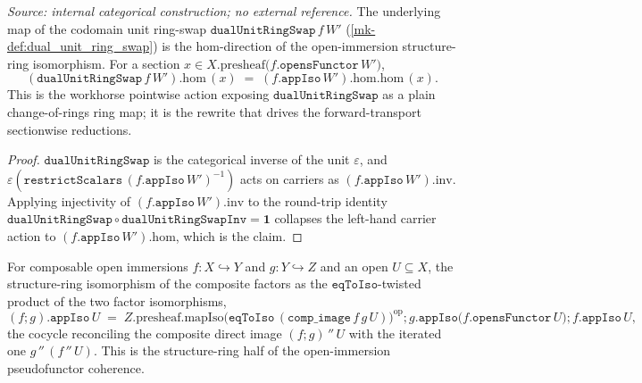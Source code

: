 \begin{lemma}\label{mk-lem:dual_unit_ring_swap_apply}
  \leanok

  \textit{Source: internal categorical construction; no external reference.}
  The underlying map of the codomain unit ring-swap \(\mathtt{dualUnitRingSwap}\,f\,W'\)
  (\ref{mk-def:dual_unit_ring_swap}) is the \(\mathrm{hom}\)-direction of the open-immersion structure-ring
  isomorphism. For a section \(x \in X.\mathrm{presheaf}\bigl(f.\mathtt{opensFunctor}\,W'\bigr)\),
  \[
    (\mathtt{dualUnitRingSwap}\,f\,W').\mathrm{hom}\,(x)
      \;=\; (f.\mathtt{appIso}\,W').\mathrm{hom}.\mathrm{hom}\,(x).
  \]
  This is the workhorse pointwise action exposing \(\mathtt{dualUnitRingSwap}\) as a plain
  change-of-rings ring map; it is the rewrite that drives the forward-transport sectionwise reductions.
\end{lemma}
\begin{proof}
  \leanok
  \(\mathtt{dualUnitRingSwap}\) is the categorical inverse of the unit \(\varepsilon\), and
  \(\varepsilon(\mathtt{restrictScalars}\,(f.\mathtt{appIso}\,W')^{-1})\) acts on carriers as
  \((f.\mathtt{appIso}\,W').\mathrm{inv}\). Applying injectivity of \((f.\mathtt{appIso}\,W').\mathrm{inv}\)
  to the round-trip identity \(\mathtt{dualUnitRingSwap} \circ \mathtt{dualUnitRingSwapInv} = \mathbf 1\)
  collapses the left-hand carrier action to \((f.\mathtt{appIso}\,W').\mathrm{hom}\), which is the claim.
\end{proof}

\begin{lemma}
  \label{mk-lem:scheme_modules_comp_appiso}
  \mathlibok

  For composable open immersions \(f : X \hookrightarrow Y\) and \(g : Y \hookrightarrow Z\) and an open
  \(U \subseteq X\), the structure-ring isomorphism of the composite factors as the
  \(\mathtt{eqToIso}\)-twisted product of the two factor isomorphisms,
  \[
    (f \mathbin{;} g).\mathtt{appIso}\,U
      \;=\; Z.\mathrm{presheaf}.\mathrm{mapIso}\bigl(\mathtt{eqToIso}\,
        (\mathtt{comp\_image}\,f\,g\,U)\bigr)^{\mathrm{op}}
        \mathbin{;} g.\mathtt{appIso}\bigl(f.\mathtt{opensFunctor}\,U\bigr) \mathbin{;} f.\mathtt{appIso}\,U,
  \]
  the cocycle reconciling the composite direct image \((f\mathbin{;}g)\,''\,U\) with the iterated one
  \(g\,''\,(f\,''\,U)\). This is the structure-ring half of the open-immersion pseudofunctor coherence.
\end{lemma}

